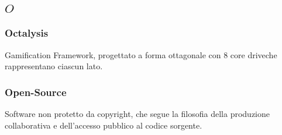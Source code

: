 \subsection*{\quad$O\quad$}
\subsubsection*{Octalysis}
Gamification Framework, progettato a forma ottagonale con 8 core drive\glosp che rappresentano ciascun lato.
\subsubsection*{Open-Source}
Software non protetto da copyright, che segue la filosofia della produzione collaborativa e dell'accesso pubblico al codice sorgente.

